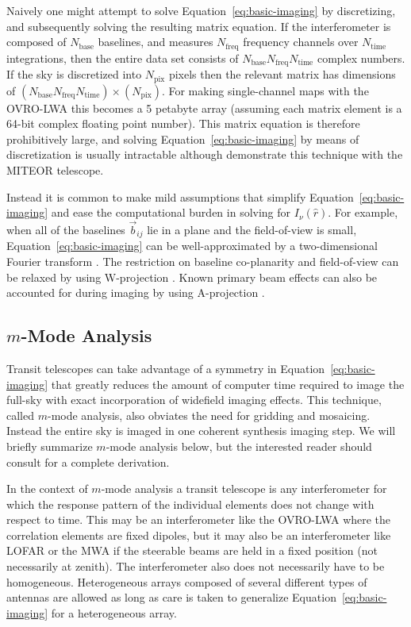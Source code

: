 \documentclass[twocolumn]{aastex61}
\begin{document}
Naively one might attempt to solve Equation~\ref{eq:basic-imaging} by discretizing, and subsequently
solving the resulting matrix equation. If the interferometer is composed of $N_\text{base}$
baselines, and measures $N_\text{freq}$ frequency channels over $N_\text{time}$ integrations, then
the entire data set consists of $N_\text{base}N_\text{freq}N_\text{time}$ complex numbers. If the
sky is discretized into $N_\text{pix}$ pixels then the relevant matrix has dimensions of
$(N_\text{base}N_\text{freq}N_\text{time})\times(N_\text{pix})$. For making single-channel maps with
the OVRO-LWA this becomes a 5 petabyte array (assuming each matrix element is a 64-bit complex
floating point number).  This matrix equation is therefore prohibitively large, and solving
Equation~\ref{eq:basic-imaging} by means of discretization is usually intractable although
\citet{2017MNRAS.465.2901Z} demonstrate this technique with the MITEOR telescope.

Instead it is common to make mild assumptions that simplify Equation~\ref{eq:basic-imaging} and ease
the computational burden in solving for $I_\nu(\hat r)$. For example, when all of the baselines
$\vec b_{ij}$ lie in a plane and the field-of-view is small, Equation~\ref{eq:basic-imaging} can be
well-approximated by a two-dimensional Fourier transform \citep{2001isra.book.....T}. The
restriction on baseline co-planarity and field-of-view can be relaxed by using W-projection
\citep{2008ISTSP...2..647C}. Known primary beam effects can also be accounted for during imaging by
using A-projection \citep{2013ApJ...770...91B}.

\subsection{$m$-Mode Analysis}\label{sec:mmode-analysis}

Transit telescopes can take advantage of a symmetry in Equation~\ref{eq:basic-imaging} that greatly
reduces the amount of computer time required to image the full-sky with exact incorporation of
widefield imaging effects. This technique, called $m$-mode analysis, also obviates the need for
gridding and mosaicing. Instead the entire sky is imaged in one coherent synthesis imaging step.  We
will briefly summarize $m$-mode analysis below, but the interested reader should consult
\citet{2014ApJ...781...57S, 2015PhRvD..91h3514S} for a complete derivation.

In the context of $m$-mode analysis a transit telescope is any interferometer for which the response
pattern of the individual elements does not change with respect to time. This may be an
interferometer like the OVRO-LWA where the correlation elements are fixed dipoles, but it may also
be an interferometer like LOFAR or the MWA if the steerable beams are held in a fixed position (not
necessarily at zenith). The interferometer also does not necessarily have to be homogeneous.
Heterogeneous arrays composed of several different types of antennas are allowed as long as care is
taken to generalize Equation~\ref{eq:basic-imaging} for a heterogeneous array.
\end{document}
